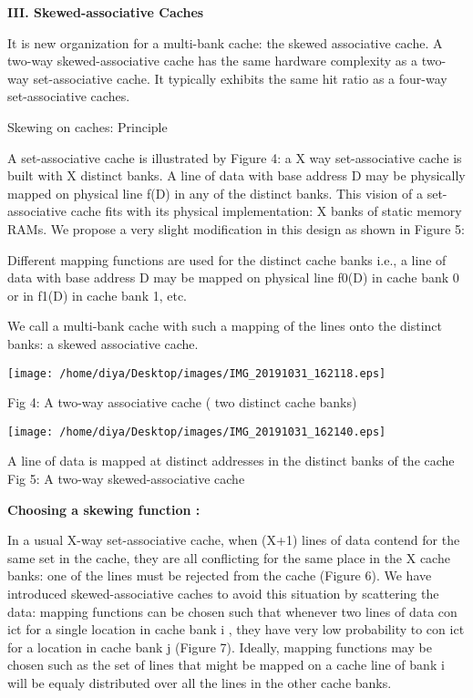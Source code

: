 \documentclass [ 12pt, letterpaper, twoside] {article}
\begin{document}
\textbf{\large III. Skewed-associative Caches }

It is new organization for a multi-bank cache: the skewed associative cache. A two-way skewed-associative cache has the same hardware complexity as a two-way set-associative cache. It typically exhibits the same hit ratio as a four-way set-associative caches.

Skewing on caches: Principle

A set-associative cache is illustrated by Figure 4: a X way set-associative cache is built with X distinct banks. A line of data with base address D may be physically mapped on physical line f(D) in any of the distinct banks. This vision of a set-associative cache fits with its physical implementation: X banks of static memory RAMs.
         We propose a very slight modification in this design as shown in Figure 5:
        
        Different mapping functions are used for the distinct cache banks i.e., a line of data with base address D may be mapped on physical line f0(D) in cache bank 0 or in f1(D) in cache bank 1, etc.

We call a multi-bank cache with such a mapping of the lines onto the distinct banks: a skewed associative cache.

\texttt{[image: /home/diya/Desktop/images/IMG\_20191031\_162118.eps]}

Fig 4: A two-way associative cache ( two distinct cache banks)

\texttt{[image: /home/diya/Desktop/images/IMG\_20191031\_162140.eps]}

A line of data is mapped at distinct addresses in the distinct banks of the cache
Fig 5: A two-way skewed-associative cache

\textbf{\large Choosing a skewing function : }

In a usual X-way set-associative cache, when (X+1) lines of data contend for the same set in the cache, they are all conflicting for the same place in the X cache banks: one of the lines must be rejected from the cache (Figure 6).
We have introduced skewed-associative caches to avoid this situation by scattering the data: mapping functions can be chosen such that whenever two lines of data con ict for a single location in cache bank i , they have very low probability to con ict for a location in cache bank j (Figure 7). Ideally, mapping functions may be chosen such as the set of lines that might be mapped on a cache line of bank i will be equaly distributed over all the lines in the other cache banks.
\end{document}
